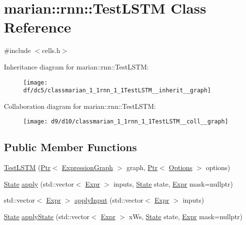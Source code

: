 \hypertarget{classmarian_1_1rnn_1_1TestLSTM}{}\section{marian\+:\+:rnn\+:\+:Test\+L\+S\+TM Class Reference}
\label{classmarian_1_1rnn_1_1TestLSTM}


{\ttfamily \#include $<$cells.\+h$>$}



Inheritance diagram for marian\+:\+:rnn\+:\+:Test\+L\+S\+TM\+:
\nopagebreak
\begin{figure}[H]
\begin{center}
\leavevmode
\texttt{[image: df/dc5/classmarian\_1\_1rnn\_1\_1TestLSTM\_\_inherit\_\_graph]}
\end{center}
\end{figure}


Collaboration diagram for marian\+:\+:rnn\+:\+:Test\+L\+S\+TM\+:
\nopagebreak
\begin{figure}[H]
\begin{center}
\leavevmode
\texttt{[image: d9/d10/classmarian\_1\_1rnn\_1\_1TestLSTM\_\_coll\_\_graph]}
\end{center}
\end{figure}
\subsection*{Public Member Functions}
\begin{DoxyCompactItemize}
\item 
\hyperlink{classmarian_1_1rnn_1_1TestLSTM_afd996ed5e9ee36a15247187e3f67fd78}{Test\+L\+S\+TM} (\hyperlink{namespacemarian_ad1a373be43a00ef9ce35666145137b08}{Ptr}$<$ \hyperlink{classmarian_1_1ExpressionGraph}{Expression\+Graph} $>$ graph, \hyperlink{namespacemarian_ad1a373be43a00ef9ce35666145137b08}{Ptr}$<$ \hyperlink{classmarian_1_1Options}{Options} $>$ options)
\item 
\hyperlink{structmarian_1_1rnn_1_1State}{State} \hyperlink{classmarian_1_1rnn_1_1TestLSTM_a1e2524b853677d43eb4425d3e0bf9d97}{apply} (std\+::vector$<$ \hyperlink{namespacemarian_a498d8baf75b754011078b890b39c8e12}{Expr} $>$ inputs, \hyperlink{structmarian_1_1rnn_1_1State}{State} state, \hyperlink{namespacemarian_a498d8baf75b754011078b890b39c8e12}{Expr} mask=nullptr)
\item 
std\+::vector$<$ \hyperlink{namespacemarian_a498d8baf75b754011078b890b39c8e12}{Expr} $>$ \hyperlink{classmarian_1_1rnn_1_1TestLSTM_ac09c1e1826106361719f05b47ed5fb9f}{apply\+Input} (std\+::vector$<$ \hyperlink{namespacemarian_a498d8baf75b754011078b890b39c8e12}{Expr} $>$ inputs)
\item 
\hyperlink{structmarian_1_1rnn_1_1State}{State} \hyperlink{classmarian_1_1rnn_1_1TestLSTM_ac19a0a1f05d7eb0510af4436dfdd40ae}{apply\+State} (std\+::vector$<$ \hyperlink{namespacemarian_a498d8baf75b754011078b890b39c8e12}{Expr} $>$ x\+Ws, \hyperlink{structmarian_1_1rnn_1_1State}{State} state, \hyperlink{namespacemarian_a498d8baf75b754011078b890b39c8e12}{Expr} mask=nullptr)
\end{DoxyCompactItemize}
